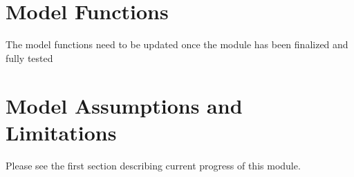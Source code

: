 \section{Model Functions}

The model functions need to be updated once the module has been finalized and fully tested

\section{Model Assumptions and Limitations}

Please see the first section describing current progress of this module. 